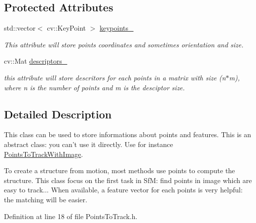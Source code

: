 \subsection*{Protected Attributes}
\begin{DoxyCompactItemize}
\item 
\hypertarget{class_opencv_sf_m_1_1_points_to_track_a08c9523080571e71e30b11a2f8b9c6b9}{
std::vector$<$ cv::KeyPoint $>$ \hyperlink{class_opencv_sf_m_1_1_points_to_track_a08c9523080571e71e30b11a2f8b9c6b9}{keypoints\_\-}}
\label{class_opencv_sf_m_1_1_points_to_track_a08c9523080571e71e30b11a2f8b9c6b9}

\begin{DoxyCompactList}\small\item\em This attribute will store points coordinates and sometimes orientation and size. \end{DoxyCompactList}\item 
\hypertarget{class_opencv_sf_m_1_1_points_to_track_adcbf3783bdf4a2a1d3e10c4b74224899}{
cv::Mat \hyperlink{class_opencv_sf_m_1_1_points_to_track_adcbf3783bdf4a2a1d3e10c4b74224899}{descriptors\_\-}}
\label{class_opencv_sf_m_1_1_points_to_track_adcbf3783bdf4a2a1d3e10c4b74224899}

\begin{DoxyCompactList}\small\item\em this attribute will store descritors for each points in a matrix with size (n$\ast$m), where n is the number of points and m is the desciptor size. \end{DoxyCompactList}\end{DoxyCompactItemize}


\subsection{Detailed Description}
This class can be used to store informations about points and features. This is an abstract class: you can't use it directly. Use for instance \hyperlink{class_opencv_sf_m_1_1_points_to_track_with_image}{PointsToTrackWithImage}. 

To create a structure from motion, most methods use points to compute the structure. This class focus on the first task in SfM: find points in image which are easy to track... When available, a feature vector for each points is very helpful: the matching will be easier. 

Definition at line 18 of file PointsToTrack.h.



